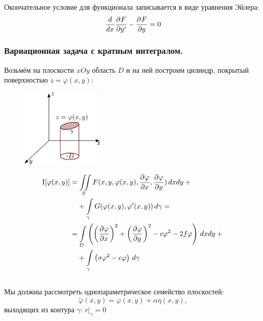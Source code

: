 Окончательное условие для функционала записывается в виде уравнения Эйлера:
\[
	\frac{d^{}}{dx^{}} \frac{\partial^{}F}{\partial y'^{}} - \frac{\partial^{}F}{\partial y^{}} = 0
\]


\subsubsection{Вариационная задача с кратным интегралом.}
Возьмём на плоскости $xOy$ область $D$ и на ней построим цилиндр, покрытый поверхностью $z = \varphi(x, y)$:
\begin{figure}
	\centering
	\includegraphics[width=0.35\textwidth]{figVariaz3.pdf}
\end{figure}
\begin{align*}
	&\mathrm{I} [\varphi(x, y)] = \iint\limits_S F(x, y, \varphi(x, y), \derp{\varphi}{x}{}, \derp{\varphi}{y}{})\, dx dy +{} \\
	&\phantom{\mathrm{I} [\varphi(x, y)]=} + \int\limits_\gamma G(\varphi(x, y), \varphi'(x, y))\, d\gamma =\\
	&\phantom{\mathrm{I} [\varphi(x, y)]} = \int\limits_D \left(\left(\derp{\varphi}{x}{} \right)^2 + \left(\derp{\varphi}{y}{} \right)^2 - c \varphi^2 - 2 f \varphi\right)\, dx dy + {}\\
	&\phantom{\mathrm{I} [\varphi(x, y)]=} + \int\limits_\gamma \left(\sigma \varphi^2 - c \varphi \right)\, d \gamma
\end{align*}\\

Мы должны рассмотреть однопараметрическое семейство плоскостей:
\[
	\tilde \varphi(x, y) = \varphi (x ,y) + \alpha \eta (x, y),
\]
выходящих из контура $\gamma$: $r \big|_\gamma = 0$


